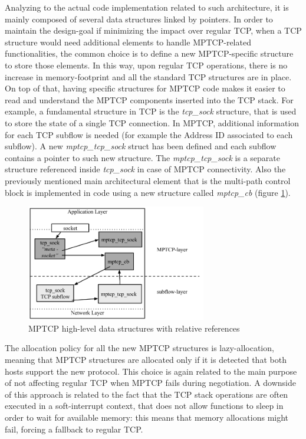 Analyzing to the actual code implementation related to such architecture, it is mainly composed of several data structures linked by pointers. In order to maintain the design-goal if minimizing the impact over regular TCP, when a TCP structure would need additional elements to handle MPTCP-related functionalities, the common choice is to define a new MPTCP-specific structure to store those elements. In this way, upon regular TCP operations, there is no increase in memory-footprint and all the standard TCP structures are in place. On top of that, having specific structures for MPTCP code makes it easier to read and understand the MPTCP components inserted into the TCP stack. For example, a fundamental structure in TCP is the \textit{tcp\_sock} structure, that is used to store the state of a single TCP connection. In MPTCP, additional information for each TCP subflow is needed (for example the Address ID associated to each subflow). A new \textit{mptcp\_tcp\_sock} struct has been defined and each subflow contains a pointer to such new structure. The \textit{mptcp\_tcp\_sock} is a separate structure referenced inside \textit{tcp\_sock} in case of MPTCP connectivity.
Also the previously mentioned main architectural element that is the multi-path control block is implemented in code using a new structure called \textit{mptcp\_cb} (figure \ref{fig:structs}).

\begin{figure}[!htb]
\centering
\includegraphics[width=0.7\textwidth]{images/structs}
\caption{MPTCP high-level data structures with relative references}
\label{fig:structs}
\end{figure}

The allocation policy for all the new MPTCP structures is lazy-allocation, meaning that MPTCP structures are allocated only if it is detected that both hosts support the new protocol. This choice is again related to the main purpose of not affecting regular TCP when MPTCP fails during negotiation. A downside of this approach is related to the fact that the TCP stack operations are often executed in a soft-interrupt context, that does not allow functions to sleep in order to wait for available memory: this means that memory allocations might fail, forcing a fallback to regular TCP.

